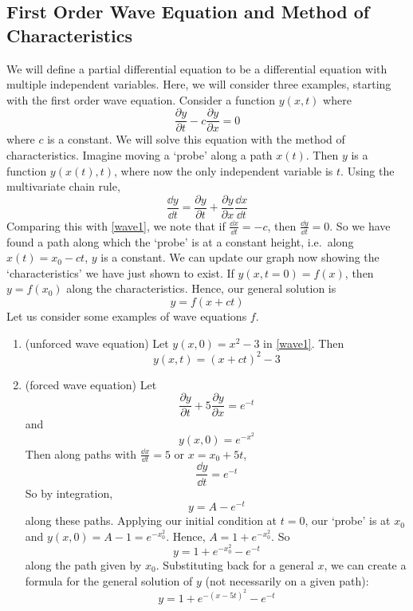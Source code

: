 \subsection{First Order Wave Equation and Method of Characteristics}
We will define a partial differential equation to be a differential equation with multiple independent variables. Here, we will consider three examples, starting with the first order wave equation. Consider a function \(y(x, t)\) where
\begin{equation}\label{wave1}
	\frac{\partial y}{\partial t} - c\frac{\partial y}{\partial x} = 0
\end{equation}
where \(c\) is a constant. We will solve this equation with the method of characteristics.
Imagine moving a `probe' along a path \(x(t)\). Then \(y\) is a function \(y(x(t), t)\), where now the only independent variable is \(t\). Using the multivariate chain rule,
\[ \frac{\dd{y}}{\dd{t}} = \frac{\partial y}{\partial t} + \frac{\partial y}{\partial x}\frac{\dd{x}}{\dd{t}} \]
Comparing this with \eqref{wave1}, we note that if \(\frac{\dd{x}}{\dd{t}} = -c\), then \(\frac{\dd{y}}{\dd{t}} = 0\). So we have found a path along which the `probe' is at a constant height, i.e.\ along \(x(t) = x_0 - ct\), \(y\) is a constant. We can update our graph now showing the `characteristics' we have just shown to exist.
If \(y(x, t = 0) = f(x)\), then \(y = f(x_0)\) along the characteristics. Hence, our general solution is
\[ y = f(x+ct) \]
Let us consider some examples of wave equations \(f\).
\begin{enumerate}
	\item (unforced wave equation) Let \(y(x,0) = x^2 - 3\) in \eqref{wave1}. Then
	      \[ y(x, t) = (x+ct)^2 - 3 \]
	\item (forced wave equation) Let
	      \[ \frac{\partial y}{\partial t} + 5\frac{\partial y}{\partial x} = e^{-t} \]
	      and
	      \[ y(x, 0) = e^{-x^2} \]
	      Then along paths with \(\frac{\dd{x}}{\dd{t}} = 5\) or \(x=x_0 + 5t\),
	      \[ \frac{\dd{y}}{\dd{t}} = e^{-t} \]
	      So by integration,
	      \[ y = A-e^{-t} \]
	      along these paths. Applying our initial condition at \(t=0\), our `probe' is at \(x_0\) and \(y(x, 0) = A - 1 = e^{-x_0^2}\). Hence, \(A = 1 + e^{-x_0^2}\). So
	      \[ y = 1 + e^{-x_0^2} - e^{-t} \]
	      along the path given by \(x_0\). Substituting back for a general \(x\), we can create a formula for the general solution of \(y\) (not necessarily on a given path):
	      \[ y = 1 + e^{-(x-5t)^2} - e^{-t} \]
\end{enumerate}
